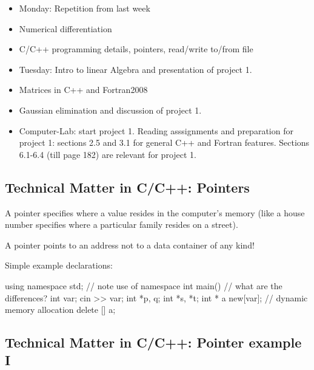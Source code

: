 \documentclass[%
oneside,                 %
final,                   %
10pt]{article}
\begin{document}
\begin{block}{}
\begin{itemize}
  \item Monday: Repetition from last week

  \item Numerical differentiation

  \item C/C++ programming details, pointers, read/write to/from file

  \item Tuesday: Intro to linear Algebra and presentation of project 1.

  \item Matrices in C++ and Fortran2008

  \item Gaussian elimination and discussion of project 1.

  \item Computer-Lab: start project 1. Reading asssignments and preparation for project 1: sections 2.5 and 3.1 for general C++ and Fortran features. Sections 6.1-6.4 (till page 182) are relevant for project 1.
\end{itemize}

\noindent
\end{block}

\subsection{Technical Matter in C/C++: Pointers}

\begin{block}{}
A pointer specifies where a value resides in the computer's memory (like a house number specifies where a particular family resides on a street).

A pointer points to an address not to a data container of any kind!

Simple example declarations:

\bcppcod
  using namespace std; // note use of namespace
  int main()
 {
   // what are the differences?
   int var;
   cin >> var;
   int *p, q;
   int *s, *t;
   int * a new[var];    // dynamic memory allocation
   delete [] a;
}
\ecppcod
\end{block}

\subsection{Technical Matter in C/C++: Pointer example I}
\end{document}
